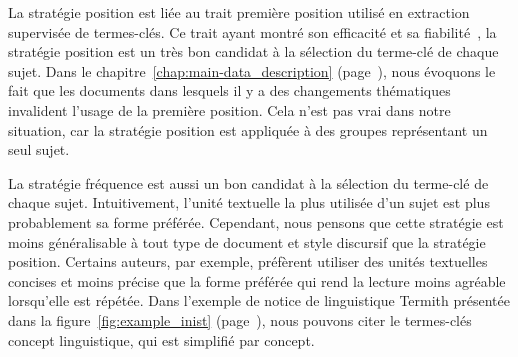         La stratégie position est liée au trait \og{}première position\fg{}
        utilisé en extraction supervisée de termes-clés. Ce trait ayant montré
        son efficacité et sa
        fiabilité~\cite{lim2012examiningthevalueofattributescores}, la stratégie
        position est un très bon candidat à la sélection du terme-clé de
        chaque sujet. Dans le chapitre~\ref{chap:main-data_description}
        (page~\pageref{chap:main-data_description}), nous évoquons le fait que
        les documents dans lesquels il y a des changements thématiques
        invalident l'usage de la première position. Cela n'est pas vrai dans
        notre situation, car la stratégie position est appliquée à des groupes
        représentant un seul sujet.

        La stratégie fréquence est aussi un bon candidat à la sélection du
        terme-clé de chaque sujet. Intuitivement, l'unité textuelle la plus
        utilisée d'un sujet est plus probablement sa forme préférée. Cependant,
        nous pensons que cette stratégie est moins généralisable à tout type de
        document et style discursif que la stratégie position. Certains
        auteurs, par exemple, préfèrent utiliser des unités textuelles concises
        et moins précise que la forme préférée qui rend la lecture moins
        agréable lorsqu'elle est répétée. Dans l'exemple de notice de
        linguistique Termith présentée dans la figure~\ref{fig:example_inist}
        (page~\pageref{fig:example_inist}), nous pouvons citer le termes-clés
        \og{}concept linguistique\fg{}, qui est simplifié par \og{}concept\fg{}.

